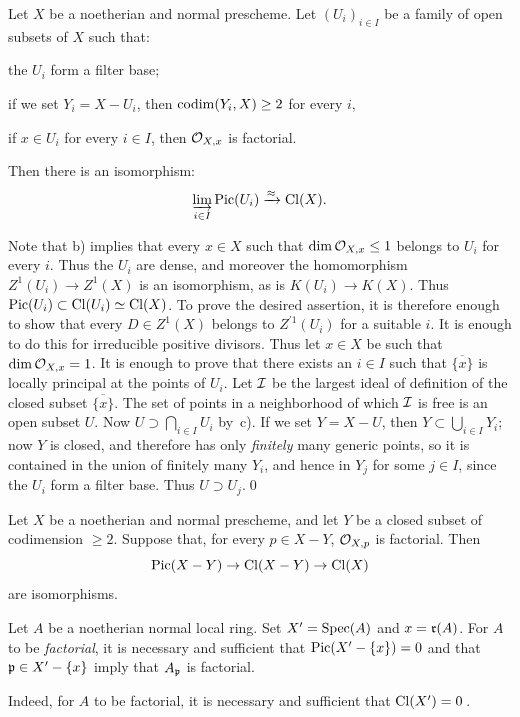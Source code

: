 \begin{propositionblah} \label{XI.3.7.1}
Let $X$ be a noetherian and normal prescheme. Let $(U_i)_{i\in I}$ be a family of open subsets of $X$ such that:
\begin{enumeratea}
\item
the $U_i$ form a filter base;
\item
if we set $Y_i=X-U_i$, then $\operatorname{codim}(Y_i, X)\geq 2$ for every $i$,
\item
if $x\in U_i$ for every $i\in I$, then $\mathcal O_{X,x}$ is factorial.
\end{enumeratea}
\noindent
Then there is an isomorphism:
\[
\varinjlim_{i\in I}\operatorname{Pic}(U_i)\xrightarrow{\approx}\operatorname{Cl}(X){}.
\]
\end{propositionblah} Note that b) implies that every $x\in X$ such that $\dim\mathcal O_{X,x}\leq 1$ belongs to $U_i$ for every $i$. Thus the $U_i$ are dense, and moreover the homomorphism $Z^1(U_i)\to Z^1(X)$ is an isomorphism, as is $K(U_i)\to K(X)$. Thus $\operatorname{Pic}(U_i)\subset \operatorname{Cl}(U_i) \simeq \operatorname{Cl}(X)$. To prove the desired assertion, it is therefore enough to show that every $D\in Z^1(X)$ belongs to $Z^{\prime1}(U_i)$ for a suitable $i$. It is enough to do this for irreducible positive \og divisors\fg. Thus let $x\in X$ be such that\pageoriginaled $\dim\mathcal O_{X,x}=1$. It is enough to prove that there exists an $i\in I$ such that $\overline{\{x\}}$ is locally principal at the points of $U_i$. Let $\mathcal I$ be the largest ideal of definition of the closed subset $\overline{\{x\}}$. The set of points in a neighborhood of which $\mathcal I$ is free is an open subset $U$. Now $U\supset \bigcap_{i\in I}U_i$ by~c). If we set $Y=X-U$, then $Y\subset \bigcup_{i\in I}Y_i$; now $Y$ is closed, and therefore has only \emph{finitely} many generic points, so it is contained in the union of finitely many $Y_i$, and hence in $Y_j$ for some $j\in I$, since the $U_i$ form a filter base. Thus $U\supset U_j$.\qed

\begin{corollaire} \label{XI.3.8}
Let $X$ be a noetherian and normal prescheme, and let $Y$ be a closed subset of codimension $\geq 2$. Suppose that, for every $p\in X-Y$, $\mathcal O_{X, p}$ is factorial. Then
\[
\operatorname{Pic}(X-Y)\to\operatorname{Cl}(X-Y)\to\operatorname{Cl}(X)
\]
are isomorphisms.
\end{corollaire}

\begin{corollaire} \label{XI.3.9}
Let $A$ be a noetherian normal local ring. Set $X'=\operatorname{Spec}(A)$ and $x = \mathfrak{r}(A)$. For $A$ to be \emph{factorial}, it is necessary and sufficient that $\operatorname{Pic}(X'-\{x\})=0$ and that $\mathfrak{p}\in X'-\{x\}$ imply that $A_{\mathfrak{p}}$ is factorial.
\end{corollaire}
Indeed, for $A$ to be factorial, it is necessary and sufficient that $\operatorname{Cl}(X')=0$\,.

